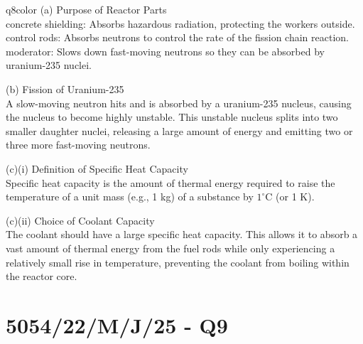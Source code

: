 \documentclass[11pt,a4paper]{article}
\newcommand{\qsection}[1]{\needspace{10\baselineskip}\section*{#1}}
\begin{document}
\begin{ansbox}{q8color}
(a) Purpose of Reactor Parts\\[4pt]
concrete shielding: Absorbs hazardous radiation, protecting the workers outside.
control rods: Absorbs neutrons to control the rate of the fission chain reaction.
moderator: Slows down fast-moving neutrons so they can be absorbed by uranium-235 nuclei.

\vspace{4pt}
(b) Fission of Uranium-235\\[4pt]
A slow-moving neutron hits and is absorbed by a uranium-235 nucleus, causing the nucleus to become highly unstable. This unstable nucleus splits into two smaller daughter nuclei, releasing a large amount of energy and emitting two or three more fast-moving neutrons.

\vspace{4pt}
(c)(i) Definition of Specific Heat Capacity\\[4pt]
Specific heat capacity is the amount of thermal energy required to raise the temperature of a unit mass (e.g., 1 kg) of a substance by $1 ^\circ\text{C}$ (or 1 K).

\vspace{4pt}
(c)(ii) Choice of Coolant Capacity\\[4pt]
The coolant should have a large specific heat capacity. This allows it to absorb a vast amount of thermal energy from the fuel rods while only experiencing a relatively small rise in temperature, preventing the coolant from boiling within the reactor core.
\end{ansbox}

\qsection{5054/22/M/J/25 - Q9}\label{p2_mj25:q9}
\end{document}
